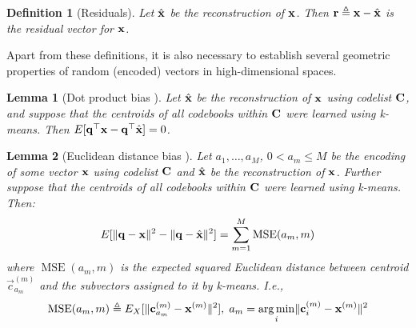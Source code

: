 \documentclass[]{article}
\newtheorem{lemma}{Lemma}[section]
\newtheorem{definition}{Definition}[section]
\DeclareMathOperator{\MSE}{MSE}
\begin{document}
\begin{definition}[Residuals]
Let $\hat{\mathbf{x}}$ be the reconstruction of $\mathbf{x}$. Then $\mathbf{r} \triangleq \mathbf{x} - \hat{\mathbf{x}}$ is the residual vector for $\mathbf{x}$.
\end{definition}

Apart from these definitions, it is also necessary to establish several geometric properties of random (encoded) vectors in high-dimensional spaces.



\begin{lemma}[Dot product bias \cite{pairQ}]
Let $\hat{\mathbf{x}}$ be the reconstruction of $\mathbf{x}$ using codelist $\mathbf{C}$, and suppose that the centroids of all codebooks within $\mathbf{C}$ were learned using k-means. Then $E[\mathbf{q}^\top \mathbf{x} - \mathbf{q}^\top \hat{\mathbf{x}}] = 0$.
\end{lemma}

\begin{lemma}[Euclidean distance bias \cite{pq, pairQ}] \label{thm:l2_bias}
Let $a_1,\ldots,a_M$, $0 < a_m \le M$ be the encoding of some vector $\mathbf{x}$ using codelist $\mathbf{C}$ and $\hat{\mathbf{x}}$ be the reconstruction of $\mathbf{x}$. Further suppose that the centroids of all codebooks within $\mathbf{C}$ were learned using k-means. Then:
\begin{align}
    E[\norm{\q - \x}^2 - \norm{\q - \xhat}^2] = \sum_{m=1}^M \MSE(a_m, m)
\end{align}
where $\MSE(a_m, m)$ is the expected squared Euclidean distance between centroid $\vec{c}_{a_m}^{(m)}$ and the subvectors assigned to it by k-means. I.e.,
\begin{align}
    \MSE(a_m, m) \triangleq E_X[\norm{\vec{c}_{a_m}^{(m)} - \x^{(m)} }^2], \hspace{1mm} a_m = \argmin_i \norm{\vec{c}_{i}^{(m)} - \x^{(m)} }^2
\end{align}
\end{lemma}
\end{document}
